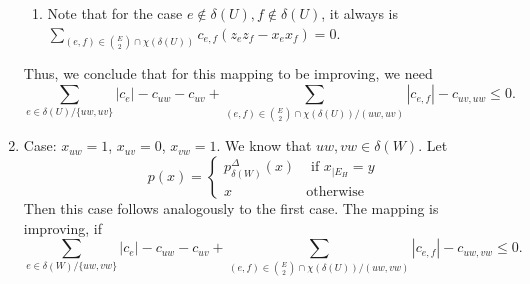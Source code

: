 \begin{enumerate}
\begin{enumerate}
\item Note that for the case $e \notin \delta(U), f \notin \delta(U)$, it always is $ \sum_{ (e,f) \in {E \choose 2} \cap \chi(\delta(U)) } c_{e,f} (z_e z_f - x_e x_f) =0$.
\end{enumerate}
Thus, we conclude that for this mapping to be improving, we need
\begin{equation*}
\sum_{e \in \delta(U)/ \{uw, uv \}} |c_e| - c_{uw} -c_{uv} + \sum_{ (e,f) \in {E \choose 2} \cap \chi(\delta(U))  / (uw, uv)} |c_{e,f}|-c_{uv,uw} \leq 0. 
\end{equation*}
 \item Case: $x_{uw}=1$, $x_{uv}=0$, $x_{vw}=1$. We know that $uw, vw \in \delta(W)$. 
 Let 
\[ p(x)= \begin{cases}
    p_{\delta(W)}^{\Delta} (x)  & \text{ if } x_{|E_H} =y \\
    x & \text{otherwise} \end{cases} \]
Then this case follows analogously to the first case. The mapping is improving, if 
\begin{equation*}
\sum_{e \in \delta(W)/ \{uw, vw \}} |c_e| - c_{uw} -c_{uv} + \sum_{ (e,f) \in {E \choose 2} \cap \chi(\delta(U))  / (uw, vw)} |c_{e,f}| - c_{uw,vw} \leq 0. 
\end{equation*}
\end{enumerate}

